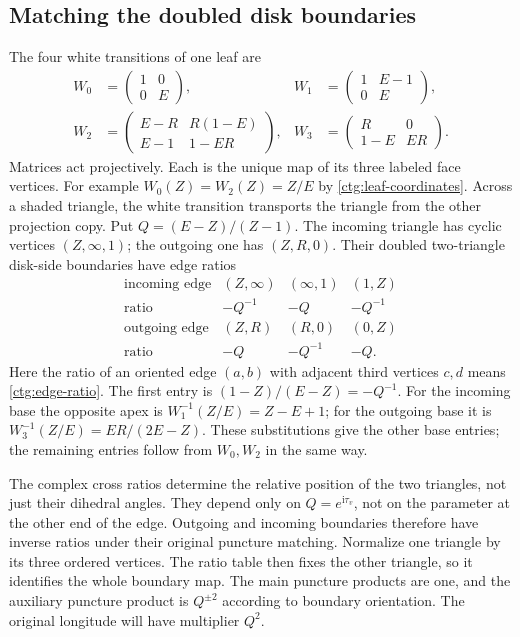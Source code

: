 \documentclass[11pt]{article}
\numberwithin{equation}{section}
\theoremstyle{definition}
\theoremstyle{remark}
\newcommand{\ii}{\mathrm i}
\begin{document}
\subsection{Matching the doubled disk boundaries}
The four white transitions of one leaf are
\begin{equation}\label{ctg:white}
\begin{aligned}
 W_0&=\begin{pmatrix}1&0\\0&E\end{pmatrix},&
 W_1&=\begin{pmatrix}1&E-1\\0&E\end{pmatrix},\\
 W_2&=\begin{pmatrix}E-R&R(1-E)\\E-1&1-ER\end{pmatrix},&
 W_3&=\begin{pmatrix}R&0\\1-E&ER\end{pmatrix}.
\end{aligned}
\end{equation}
Matrices act projectively. Each is the unique map of its three labeled
face vertices. For example $W_0(Z)=W_2(Z)=Z/E$ by
\eqref{ctg:leaf-coordinates}. Across a shaded triangle, the white
transition transports the triangle from the other projection copy.
Put $Q=(E-Z)/(Z-1)$. The incoming triangle has cyclic vertices
$(Z,\infty,1)$; the outgoing one has $(Z,R,0)$. Their doubled
two-triangle disk-side boundaries have edge ratios
\begin{equation}\label{ctg:pants}
\begin{array}{c|ccc}
 \text{incoming edge}&(Z,\infty)&(\infty,1)&(1,Z)\\\hline
 \text{ratio}&-Q^{-1}&-Q&-Q^{-1}\\[1mm]
 \text{outgoing edge}&(Z,R)&(R,0)&(0,Z)\\\hline
 \text{ratio}&-Q&-Q^{-1}&-Q.
\end{array}
\end{equation}
Here the ratio of an oriented edge $(a,b)$ with adjacent third
vertices $c,d$ means \eqref{ctg:edge-ratio}. The first entry is
$(1-Z)/(E-Z)=-Q^{-1}$. For the incoming base the opposite apex is
$W_1^{-1}(Z/E)=Z-E+1$; for the outgoing base it is
$W_3^{-1}(Z/E)=ER/(2E-Z)$. These substitutions give the other base
entries; the remaining entries follow from $W_0,W_2$ in the same way.

The complex cross ratios determine the relative position of the two
triangles, not just their dihedral angles. They depend only on
$Q=e^{\ii\tau_v}$, not on the parameter at the other end of the edge.
Outgoing and incoming boundaries therefore have inverse ratios under
their original puncture matching. Normalize one triangle by its three
ordered vertices. The ratio table then fixes the other triangle, so
it identifies the whole boundary map. The main puncture products are
one, and the auxiliary puncture product is $Q^{\pm2}$ according to
boundary orientation. The original longitude will have multiplier
$Q^2$.
\end{document}
